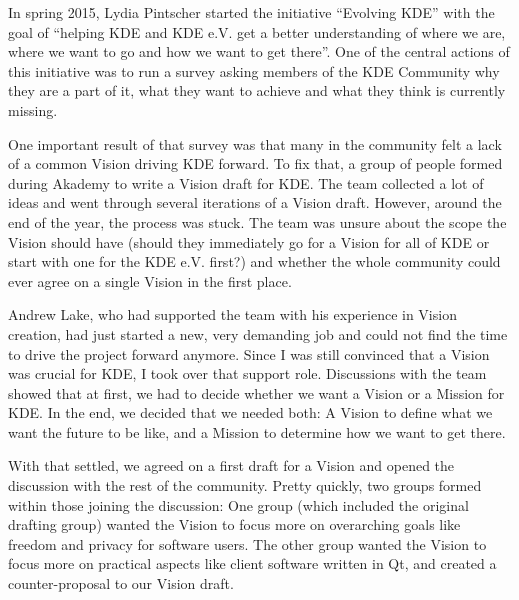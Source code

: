 

\noindent{}In spring 2015, Lydia Pintscher started the initiative ``Evolving KDE'' with the goal of ``helping KDE and KDE e.V. get a better understanding of where we are, where we want to go and how we want to get there''. One of the central actions of this initiative was to run a survey asking members of the KDE Community why they are a part of it, what they want to achieve and what they think is currently missing.

One important result of that survey was that many in the community felt a lack of a common Vision driving KDE forward. To fix that, a group of people formed during Akademy to write a Vision draft for KDE. The team collected a lot of ideas and went through several iterations of a Vision draft. However, around the end of the year, the process was stuck. The team was unsure about the scope the Vision should have (should they immediately go for a Vision for all of KDE or start with one for the KDE e.V. first?) and whether the whole community could ever agree on a single Vision in the first place.

Andrew Lake, who had supported the team with his experience in Vision creation, had just started a new, very demanding job and could not find the time to drive the project forward anymore. Since I was still convinced that a Vision was crucial for KDE, I took over that support role. Discussions with the team showed that at first, we had to decide whether we want a Vision or a Mission for KDE. In the end, we decided that we needed both: A Vision to define what we want the future to be like, and a Mission to determine how we want to get there.

With that settled, we agreed on a first draft for a Vision and opened the discussion with the rest of the community. Pretty quickly, two groups formed within those joining the discussion: One group (which included the original drafting group) wanted the Vision to focus more on overarching goals like freedom and privacy for software users. The other group wanted the Vision to focus more on practical aspects like client software written in Qt, and created a counter-proposal to our Vision draft.

